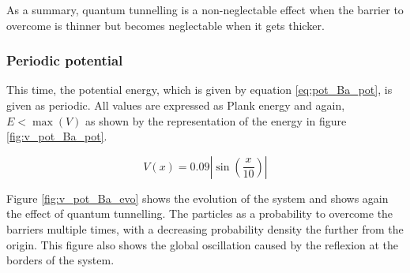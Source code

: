 \documentclass[a4paper,12pt,twoside]{article}
\newcommand{\bracket}[1]{\left(#1\right)}
\newcommand{\abs}[1]{\left|#1\right|}
\begin{document}

        As a summary, quantum tunnelling is a non-neglectable effect when the barrier to overcome is thinner but becomes neglectable when it gets thicker.

      \subsubsection{Periodic potential}
      This time, the potential energy, which is given by equation \eqref{eq:pot_Ba_pot}, is given as periodic.
      All values are expressed as Plank energy and again, $E<\max\bracket{V}$ as shown by the representation of the energy in figure \ref{fig:v_pot_Ba_pot}.

      \begin{equation}
        V(x) = 0.09\abs{\sin\bracket{\frac{x}{10}}}
        \label{eq:pot_Ba_pot}
      \end{equation}

      Figure \ref{fig:v_pot_Ba_evo} shows the evolution of the system and shows again the effect of quantum tunnelling.
      The particles as a probability to overcome the barriers multiple times, with a decreasing probability density the further from the origin.
      This figure also shows the global oscillation caused by the reflexion at the borders of the system.
\end{document}
